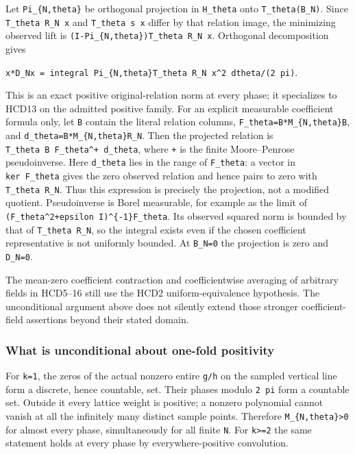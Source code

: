 Let \texttt{Pi\_\{N,theta\}} be orthogonal projection in \texttt{H\_theta} onto \texttt{T\_theta(B\_N)}. Since \texttt{T\_theta\ R\_N\ x} and \texttt{T\_theta\ s\ x} differ by that relation image, the minimizing observed lift is \texttt{(I-Pi\_\{N,theta\})T\_theta\ R\_N\ x}. Orthogonal decomposition gives

\texttt{x*D\_Nx\ =\ integral\ \textbar{}\textbar{}Pi\_\{N,theta\}T\_theta\ R\_N\ x\textbar{}\textbar{}\^{}2\ dtheta/(2\ pi)}.

This is an exact positive original-relation norm at every phase; it specializes to HCD13 on the admitted positive family. For an explicit measurable coefficient formula only, let \texttt{B} contain the literal relation columns, \texttt{F\_theta=B*M\_\{N,theta\}B}, and \texttt{d\_theta=B*M\_\{N,theta\}R\_N}. Then the projected relation is \texttt{T\_theta\ B\ F\_theta\^{}+\ d\_theta}, where \texttt{+} is the finite Moore--Penrose pseudoinverse. Here \texttt{d\_theta} lies in the range of \texttt{F\_theta}: a vector in \texttt{ker\ F\_theta} gives the zero observed relation and hence pairs to zero with \texttt{T\_theta\ R\_N}. Thus this expression is precisely the projection, not a modified quotient. Pseudoinverse is Borel measurable, for example as the limit of \texttt{(F\_theta\^{}2+epsilon\ I)\^{}\{-1\}F\_theta}. Its observed squared norm is bounded by that of \texttt{T\_theta\ R\_N}, so the integral exists even if the chosen coefficient representative is not uniformly bounded. At \texttt{B\_N=0} the projection is zero and \texttt{D\_N=0}.

The mean-zero coefficient contraction and coefficientwise averaging of arbitrary fields in HCD5--16 still use the HCD2 uniform-equivalence hypothesis. The unconditional argument above does not silently extend those stronger coefficient-field assertions beyond their stated domain.

\subsubsection{What is unconditional about one-fold positivity}\label{what-is-unconditional-about-one-fold-positivity}

For \texttt{k=1}, the zeros of the actual nonzero entire \texttt{g/h} on the sampled vertical line form a discrete, hence countable, set. Their phases modulo \texttt{2\ pi} form a countable set. Outside it every lattice weight is positive; a nonzero polynomial cannot vanish at all the infinitely many distinct sample points. Therefore \texttt{M\_\{N,theta\}\textgreater{}0} for almost every phase, simultaneously for all finite \texttt{N}. For \texttt{k\textgreater{}=2} the same statement holds at every phase by everywhere-positive convolution.

